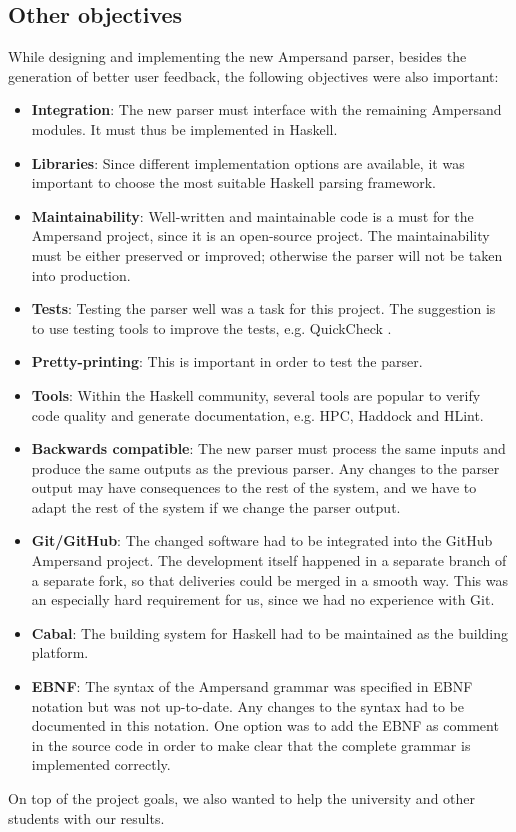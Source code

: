 
\subsection{Other objectives}
While designing and implementing the new Ampersand parser, besides the generation of better user feedback, the following objectives were also important:
\begin{itemize}
  \item \textbf{Integration}: The new parser must interface with the remaining Ampersand modules.
    It must thus be implemented in Haskell.
  \item \textbf{Libraries}: Since different implementation options are available, it was important to choose the most suitable Haskell parsing framework.
  \item \textbf{Maintainability}: Well-written and maintainable code is a must for the Ampersand project, since it is an open-source project.
    The maintainability must be either preserved or improved; otherwise the parser will not be taken into production.
  \item \textbf{Tests}: Testing the parser well was a task for this project.
    The suggestion is to use testing tools to improve the tests, e.g. QuickCheck .
  \item \textbf{Pretty-printing}: This is important in order to test the parser.
%
%
%
  \item \textbf{Tools}: Within the Haskell community, several tools are popular to verify code quality and generate documentation, e.g. HPC, Haddock and HLint.
  \item \textbf{Backwards compatible}: The new parser must process the same inputs and produce the same outputs as the previous parser.
    Any changes to the parser output may have consequences to the rest of the system, and we have to adapt the rest of the system if we change the parser output.
  \item \textbf{Git/GitHub}: The changed software had to be integrated into the GitHub Ampersand project.
    The development itself happened in a separate branch of a separate fork, so that deliveries could be merged in a smooth way.
    This was an especially hard requirement for us, since we had no experience with Git.
  \item \textbf{Cabal}: The building system for Haskell had to be maintained as the building platform.
  \item \textbf{EBNF}: The syntax of the Ampersand grammar was specified in EBNF notation but was not up-to-date.
    Any changes to the syntax had to be documented in this notation.
    One option was to add the EBNF as comment in the source code in order to make clear that the complete grammar is implemented correctly.
\end{itemize}

On top of the project goals, we also wanted to help the university and other students with our results.
